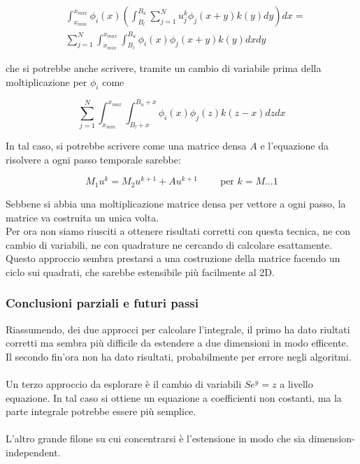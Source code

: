 \documentclass[a4paper,10pt]{article}
\begin{document}
\begin{align*}
 & \int_{x_{min}}^{x_{max}}\phi_i(x)\left( \int_{B_l}^{B_u} \sum_{j=1}^N u_j^k \phi_j(x+y)k(y)dy \right)dx=\\ 
 &\sum_{j=1}^N  \int_{x_{min}}^{x_{max}}\int_{B_l}^{B_u} \phi_i(x)\phi_j(x+y)k(y)dxdy
\end{align*}

che si potrebbe anche scrivere, tramite un cambio di variabile prima della moltiplicazione per $\phi_i$ come

\begin{equation*}
 \sum_{j=1}^N  \int_{x_{min}}^{x_{max}}\int_{B_l+x}^{B_u+x} \phi_i(x)\phi_j(z)k(z-x)dzdx
\end{equation*}

In tal caso, si potrebbe scrivere come una matrice densa $A$ e l'equazione da risolvere a ogni passo temporale sarebbe:

\begin{equation*}
 M_1u^k=M_2u^{k+1}+Au^{k+1}  \qquad \text{ per } k=M\dots1
\end{equation*}

Sebbene si abbia una moltiplicazione matrice densa per vettore a ogni passo, la matrice va costruita un unica volta.\\
Per ora non siamo riusciti a ottenere risultati corretti con questa tecnica, ne con cambio di variabili, ne con quadrature ne cercando di calcolare esattamente. Questo approccio sembra prestarsi a una costruzione della matrice facendo un ciclo sui quadrati, che sarebbe estensibile più facilmente al 2D.

\subsubsection{Conclusioni parziali e futuri passi}

Riassumendo, dei due approcci per calcolare l'integrale, il primo ha dato riultati corretti ma sembra più difficile da estendere a due dimensioni in modo efficente. Il secondo fin'ora non ha dato risultati, probabilmente per errore negli algoritmi.\\ \\
Un terzo approccio da esplorare è il cambio di variabili $Se^y=z$ a livello equazione. In tal caso si ottiene un equazione a coefficienti non costanti, ma la parte integrale potrebbe essere più semplice.
\\ \\
L'altro grande filone su cui concentrarsi è l'estensione in modo che sia dimension-independent.
\end{document}
